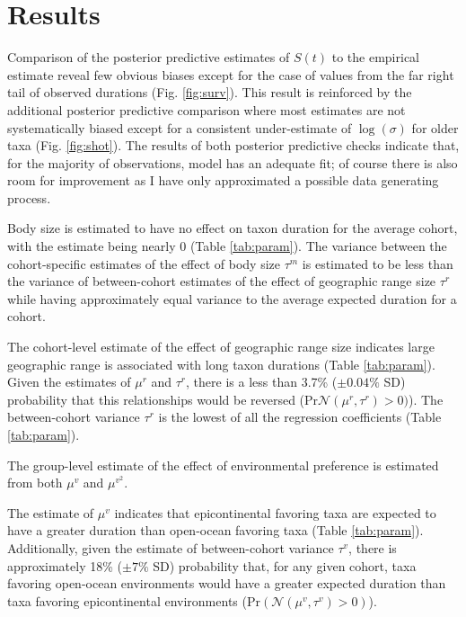 \documentclass{article}
\begin{document}




\section{Results}

Comparison of the posterior predictive estimates of \(S(t)\) to the empirical estimate reveal few obvious biases except for the case of values from the far right tail of observed durations (Fig. \ref{fig:surv}). This result is reinforced by the additional posterior predictive comparison where most estimates are not systematically biased except for a consistent under-estimate of \(\log(\sigma)\) for older taxa (Fig. \ref{fig:shot}). The results of both posterior predictive checks indicate that, for the majority of observations, model has an adequate fit; of course there is also room for improvement as I have only approximated a possible data generating process.

Body size is estimated to have no effect on taxon duration for the average cohort, with the estimate being nearly 0 (Table \ref{tab:param}). The variance between the cohort-specific estimates of the effect of body size \(\tau^{m}\) is estimated to be less than the variance of between-cohort estimates of the effect of geographic range size \(\tau^{r}\) while having approximately equal variance to the average expected duration for a cohort. 

The cohort-level estimate of the effect of geographic range size indicates large geographic range is associated with long taxon durations (Table \ref{tab:param}). Given the estimates of \(\mu^{r}\) and \(\tau^{r}\), there is a less than 3.7\% (\(\pm 0.04\%\) SD) probability that this relationships would be reversed (\(\mathrm{Pr}\mathcal{N}(\mu^{r}, \tau^{r}) > 0)\)). The between-cohort variance \(\tau^{r}\) is the lowest of all the regression coefficients (Table \ref{tab:param}).

The group-level estimate of the effect of environmental preference is estimated from both \(\mu^{v}\) and \(\mu^{v^{2}}\). 

The estimate of \(\mu^{v}\) indicates that epicontinental favoring taxa are expected to have a greater duration than open-ocean favoring taxa (Table \ref{tab:param}). Additionally, given the estimate of between-cohort variance \(\tau^{v}\), there is approximately 18\% (\(\pm 7\%\) SD) probability that, for any given cohort, taxa favoring open-ocean environments would have a greater expected duration than taxa favoring epicontinental environments (\(\mathrm{Pr}(\mathcal{N}(\mu^{v}, \tau^{v}) > 0)\)). 
\end{document}
